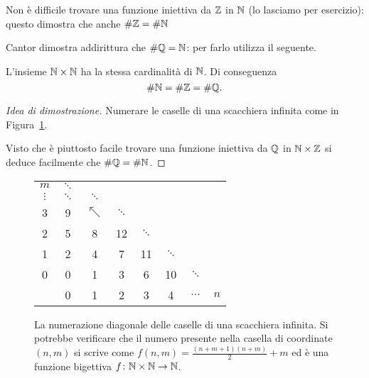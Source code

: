 Non è difficile trovare una funzione iniettiva da ${\mathbb Z}$ in ${\mathbb N}$
(lo lasciamo per esercizio): questo dimostra che anche $\#{\mathbb Z} = \# {\mathbb N}$

Cantor dimostra addirittura che $\#{\mathbb Q} = {\mathbb N}$: per farlo utilizza il seguente.

\begin{theorem}
\label{th:Cantor_primo}%
%
L'insieme ${\mathbb N} \times {\mathbb N}$ ha la stessa cardinalità di ${\mathbb N}$. Di conseguenza
\[
  \# {\mathbb N} = \# {\mathbb Z} = \# {\mathbb Q}.
  \]
\end{theorem}
%
\begin{proof}[Idea di dimostrazione]
  Numerare le caselle di una scacchiera infinita
  come in Figura~\ref{fig:cantor1}.
  
  Visto che è piuttosto facile trovare una funzione iniettiva 
  da ${\mathbb Q}$ in ${\mathbb N} \times {\mathbb Z}$ si deduce facilmente che $\#{\mathbb Q} = \#{\mathbb N}$.
\end{proof}

\begin{figure}
  \begin{tabular}{c|ccccccc}
   $m$ & $\ddots$\\
   $\vdots$ & $\ddots$ & $\ddots$\\
   3 & 9 & $\nwarrow$ & $\ddots$ \\
   2 & 5 & 8 & 12 & $\ddots$ \\
   1 & 2 & 4 & 7 & 11 & $\ddots$ \\
   0 & 0 & 1 & 3 & 6 & 10 & $\ddots$ \\ \hline
     & 0 & 1 & 2 & 3 & 4 & $\dots$ & $n$
  \end{tabular}
  \caption{
    La numerazione diagonale delle caselle
    di una scacchiera infinita. Si potrebbe verificare
    che il numero presente nella casella di coordinate $(n,m)$
    si scrive come $f(n,m) = \frac{(n+m+1)(n+m)}{2}+m$
    ed è una funzione bigettiva $f\colon {\mathbb N}\times{\mathbb N} \to{\mathbb N}$.}
  \label{fig:cantor1}
\end{figure}

